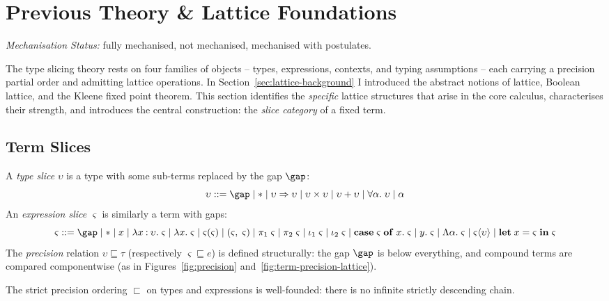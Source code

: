 \section{Previous Theory \& Lattice Foundations}
\label{sec:lattice}

\noindent\textit{Mechanisation Status:} \yo fully mechanised, \no not mechanised, \po mechanised with postulates.

\bigskip

\noindent The type slicing theory rests on four families of objects -- types, expressions, contexts, and typing assumptions -- each carrying a precision partial order and admitting lattice operations. In Section~\ref{sec:lattice-background} I introduced the abstract notions of lattice, Boolean lattice, and the Kleene fixed point theorem. This section identifies the \textit{specific} lattice structures that arise in the core calculus, characterises their strength, and introduces the central construction: the \textit{slice category} of a fixed term.

\subsection{Term Slices}
\label{sec:term-slices}

A \textit{type slice} $\upsilon$ is a type with some sub-terms replaced by the gap $\gap$:
\[\upsilon ::= \gap \mid * \mid \upsilon \Rightarrow \upsilon \mid \upsilon \times \upsilon \mid \upsilon + \upsilon \mid \forall\alpha.\;\upsilon \mid \alpha\]
An \textit{expression slice} $\varsigma$ is similarly a term with gaps:
\[\varsigma ::= \gap \mid * \mid x \mid \lambda x \mathbin{:} \upsilon.\; \varsigma \mid \lambda x.\; \varsigma \mid \varsigma(\varsigma) \mid (\varsigma,\; \varsigma) \mid \pi_1\; \varsigma \mid \pi_2\; \varsigma \mid \iota_1\; \varsigma \mid \iota_2\; \varsigma \mid \mathbf{case}\;\varsigma\;\mathbf{of}\;x.\;\varsigma \mid y.\;\varsigma \mid \Lambda\alpha.\;\varsigma \mid \varsigma\langle\upsilon\rangle \mid \mathbf{let}\;x = \varsigma\;\mathbf{in}\;\varsigma\]
The \textit{precision} relation $\upsilon \sqsubseteq \tau$ (respectively $\varsigma \sqsubseteq e$) is defined structurally: the gap $\gap$ is below everything, and compound terms are compared componentwise (as in Figures~\ref{fig:precision} and~\ref{fig:term-precision-lattice}).

\begin{proposition}\label{prop:precision-wf}
The strict precision ordering $\sqsubset$ on types and expressions is well-founded: there is no infinite strictly descending chain.
\end{proposition}

